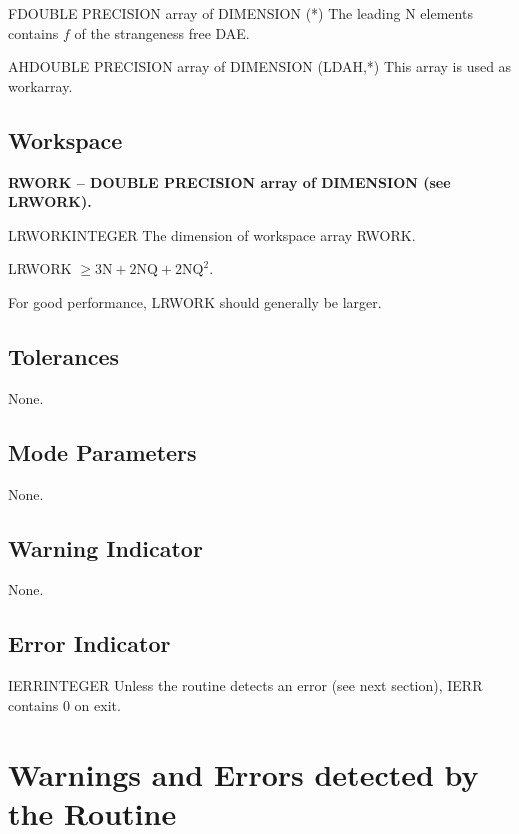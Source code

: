 \begin{entry}{F}{DOUBLE PRECISION array of DIMENSION (*)}
  The leading N elements contains $f$ of the strangeness free DAE. 
\end{entry}

\begin{entry}{AH}{DOUBLE PRECISION array of DIMENSION (LDAH,*)}
  This array is used as workarray.
\end{entry}

\subsection{Workspace}

\noindent
{\bf RWORK -- {DOUBLE PRECISION array of DIMENSION (see LRWORK)}.}
\medskip

\begin{entry}{LRWORK}{INTEGER}
  The dimension of workspace array RWORK. 

  LRWORK $\ge 3\mbox{N} + 2\mbox{NQ} + 2\mbox{NQ}^2$.

  For good performance, LRWORK should generally be larger.
\end{entry}

\subsection{Tolerances}
None.

\subsection{Mode Parameters}
None.

\subsection{Warning Indicator}
None.

\subsection{Error Indicator}
\begin{entry}{IERR}{INTEGER}
  Unless the routine detects an error (see next section), IERR
  contains $0$ on exit.
\end{entry}

\section{Warnings and Errors detected by the Routine}

